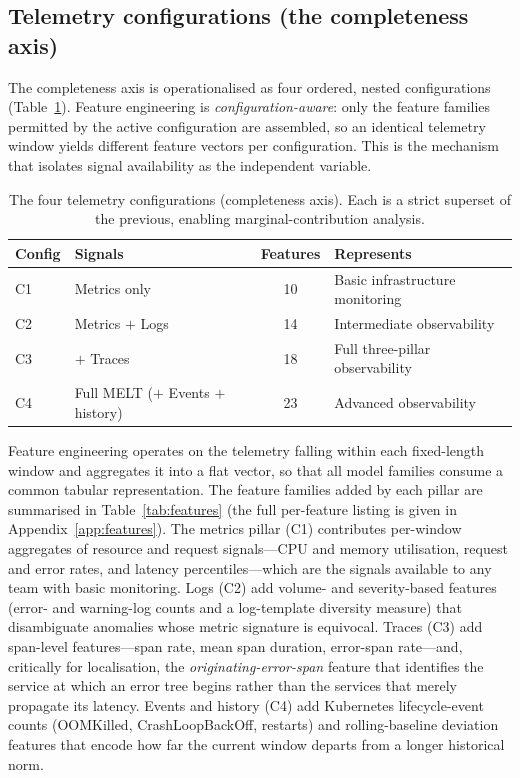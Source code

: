 \documentclass[acmsmall]{acmart}
\begin{document}
\subsection{Telemetry configurations (the completeness axis)}\label{sec:method-configs}

The completeness axis is operationalised as four ordered, nested configurations (Table~\ref{tab:configs}). Feature engineering is \emph{configuration-aware}: only the feature families permitted by the active configuration are assembled, so an identical telemetry window yields different feature vectors per configuration. This is the mechanism that isolates signal availability as the independent variable.

\begin{table}[t]
\caption{The four telemetry configurations (completeness axis). Each is a strict superset of the previous, enabling marginal-contribution analysis.}\label{tab:configs}
\begin{tabular}{@{}llcl@{}}
\toprule
Config & Signals & Features & Represents \\
\midrule
C1 & Metrics only        & 10 & Basic infrastructure monitoring \\
C2 & Metrics ${+}$ Logs  & 14 & Intermediate observability \\
C3 & ${+}$ Traces        & 18 & Full three-pillar observability \\
C4 & Full MELT (${+}$ Events ${+}$ history) & 23 & Advanced observability \\
\bottomrule
\end{tabular}
\end{table}

Feature engineering operates on the telemetry falling within each fixed-length window and aggregates it into a flat vector, so that all model families consume a common tabular representation. The feature families added by each pillar are summarised in Table~\ref{tab:features} (the full per-feature listing is given in Appendix~\ref{app:features}). The metrics pillar (C1) contributes per-window aggregates of resource and request signals---CPU and memory utilisation, request and error rates, and latency percentiles---which are the signals available to any team with basic monitoring. Logs (C2) add volume- and severity-based features (error- and warning-log counts and a log-template diversity measure) that disambiguate anomalies whose metric signature is equivocal. Traces (C3) add span-level features---span rate, mean span duration, error-span rate---and, critically for localisation, the \emph{originating-error-span} feature that identifies the service at which an error tree begins rather than the services that merely propagate its latency. Events and history (C4) add Kubernetes lifecycle-event counts (OOMKilled, CrashLoopBackOff, restarts) and rolling-baseline deviation features that encode how far the current window departs from a longer historical norm.
\end{document}
